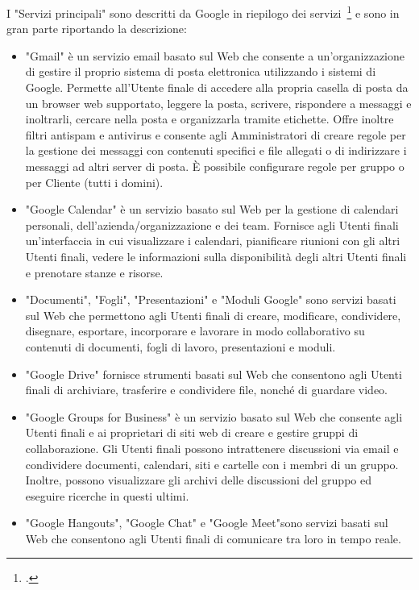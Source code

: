 I "Servizi principali" sono  descritti da \textenglish{Google} in riepilogo dei servizi~\footcite{Google2022d} e sono in gran parte riportando la descrizione:
\begin{itemize}
	\item \textenglish{"Gmail"} è un servizio email basato sul Web che consente a un'organizzazione di gestire il proprio sistema di posta elettronica utilizzando i sistemi di \textenglish{Google}. Permette all'Utente finale di accedere alla propria casella di posta da un browser web supportato, leggere la posta, scrivere, rispondere a messaggi e inoltrarli, cercare nella posta e organizzarla tramite etichette. Offre inoltre filtri antispam e antivirus e consente agli Amministratori di creare regole per la gestione dei messaggi con contenuti specifici e file allegati o di indirizzare i messaggi ad altri server di posta. È possibile configurare regole per gruppo o per Cliente (tutti i domini).
	\item \textenglish{"Google Calendar"} è un servizio basato sul Web per la gestione di calendari personali, dell'azienda/organizzazione e dei team. Fornisce agli Utenti finali un'interfaccia in cui visualizzare i calendari, pianificare riunioni con gli altri Utenti finali, vedere le informazioni sulla disponibilità degli altri Utenti finali e prenotare stanze e risorse.
	\item "Documenti", "Fogli", "Presentazioni" e "Moduli \textenglish{Google}" sono servizi basati sul Web che permettono agli Utenti finali di creare, modificare, condividere, disegnare, esportare, incorporare e lavorare in modo collaborativo su contenuti di documenti, fogli di lavoro, presentazioni e moduli.
	\item \textenglish{"Google Drive"} fornisce strumenti basati sul Web che consentono agli Utenti finali di archiviare, trasferire e condividere file, nonché di guardare video.
	\item \textenglish{"Google Groups for Business"} è un servizio basato sul Web che consente agli Utenti finali e ai proprietari di siti web di creare e gestire gruppi di collaborazione. Gli Utenti finali possono intrattenere discussioni via email e condividere documenti, calendari, siti e cartelle con i membri di un gruppo. Inoltre, possono visualizzare gli archivi delle discussioni del gruppo ed eseguire ricerche in questi ultimi.
	\item  \textenglish{"Google Hangouts"},  \textenglish{"Google Chat"} e   \textenglish{"Google Meet"}sono servizi basati sul Web che consentono agli Utenti finali di comunicare tra loro in tempo reale. 
	

\end{itemize}
